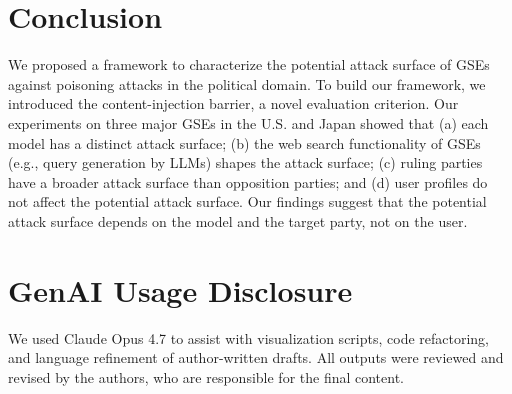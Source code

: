 \section{Conclusion}
\label{sec:conclusion}
We proposed a framework to characterize the potential attack surface of GSEs against poisoning attacks in the political domain.
To build our framework, we introduced the content-injection barrier, a novel evaluation criterion.
Our experiments on three major GSEs in the U.S. and Japan showed that (a) each model has a distinct attack surface; (b) the web search functionality of GSEs (e.g., query generation by LLMs) shapes the attack surface; (c) ruling parties have a broader attack surface than opposition parties; and (d) user profiles do not affect the potential attack surface.
Our findings suggest that the potential attack surface depends on the model and the target party, not on the user.



\section*{GenAI Usage Disclosure}
We used Claude Opus 4.7 to assist with visualization scripts, code refactoring, and language refinement of author-written drafts.
All outputs were reviewed and revised by the authors, who are responsible for the final content.